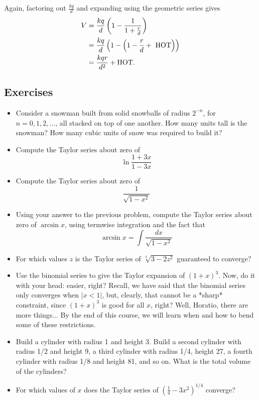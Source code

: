 \documentclass[twoside,openright,titlepage,a4paper]{book}
\begin{document}
\begin{sloppypar}
Again, factoring out $\frac{kq}{d}$ and expanding using the geometric series gives
\begin{align*}
V &= \frac{kq}{d} \left(1 - \frac{1}{1+\frac{r}{d}}\right) \\
&= \frac{kq}{d} \left(1 - \left(1 - \frac{r}{d} + \hbox{ HOT}\right)\right) \\
&= \frac{kqr}{d^2} + \hbox{HOT}. 
\end{align*}

\subsection{Exercises}

\begin{itemize}
\item Consider a snowman built from solid snowballs of radius $2^{-n}$, for $n=0,1,2,\ldots $, all stacked on top of one another. How many units tall is the snowman? How many cubic units of snow was required to build it?
\item Compute the Taylor series about zero of \[ \ln\frac{1+3x}{1-3x} \]
\item Compute the Taylor series about zero of \[ \frac{1}{\sqrt{1-x^2}} \]
\item Using your answer to the previous problem, compute the Taylor series about zero of $\arcsin x$, using termwise integration and the fact that \[ \arcsin x = \int \frac{dx}{\sqrt{1-x^2}} \]
\item For which values $z$ is the Taylor series of $\sqrt[4]{3-2z^2}$ guaranteed to converge?
\item Use the binomial series to give the Taylor expansion of $(1+x)^3$. Now, do it with your head: easier, right? Recall, we have said that the binomial series only converges when $|x<1|$, but, clearly, that cannot be a *sharp* constraint, since $(1+x)^3$ is good for all $x$, right? Well, Horatio, there are more things... By the end of this course, we will learn when and how to bend some of these restrictions.
\item Build a cylinder with radius 1 and height 3. Build a second cylinder with radius 1/2 and height 9, a third cylinder with radius 1/4, height 27, a fourth cylinder with radius 1/8 and height 81, and so on. What is the total volume of the cylinders?
\item For which values of $x$ does the Taylor series of $(\frac{1}{4}-3x^2)^{1/4}$ converge?
\end{itemize}


\end{sloppypar}
\end{document}
